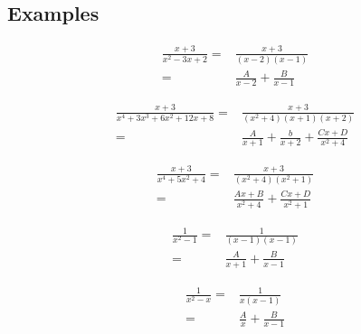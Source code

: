 \subsection{Examples}

\begin{ex}
  \begin{align*}
    \frac{x+3}{x^2-3x+2}
   =&\frac{x+3}{(x-2)(x-1)} \\
   =&\frac{A}{x-2}+\frac {B}{x-1}
  \end{align*}
\end{ex}
\begin{ex}
  \begin{align*}
    \frac {x+3} {x^4+3x^3+6x^2+12x+8}
    =&\frac {x+3} {(x^2+4)(x+1)(x+2)} \\
    =&\frac{A}{x+1}+\frac{b}{x+2}+\frac{Cx+D}{x^2+4}
  \end{align*}
\end{ex}
\begin{ex}
  \begin{align*}
    \frac{x+3}{x^4+5x^2+4}
    =&\frac{x+3}{(x^2+4)(x^2+1)}\\
    =&\frac{Ax+B}{x^2+4}+\frac{Cx+D}{x^2+1}
  \end{align*}
\end{ex}
\begin{ex}
  \begin{align*}
    \frac{1}{x^2-1}
    =&\frac{1}{(x-1)(x-1)} \\
    =&\frac{A}{x+1}+\frac{B}{x-1}
  \end{align*}
\end{ex}
\begin{ex}
  \begin{align*}
    \frac{1}{x^2-x}
     =&\frac{1}{x(x-1)} \\
     =&\frac{A}{x}+\frac{B}{x-1}
  \end{align*}
\end{ex}

